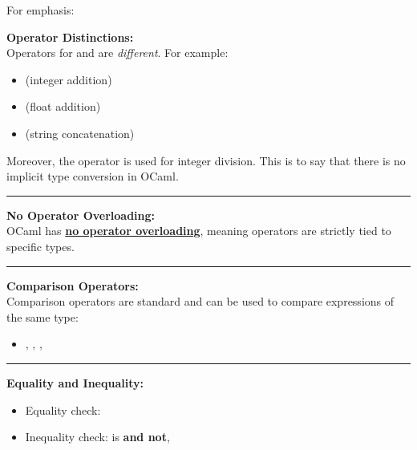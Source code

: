 \noindent
For emphasis:
\begin{Def}

    \noindent
    \textbf{Operator Distinctions:}\\
    Operators for  and  are \textit{different}. For example:
    \begin{itemize}
        \item \snippet{+} (integer addition)
        \item {} (float addition)
        \item \snippet{$^\wedge$} (string concatenation)
    \end{itemize}
    
    \noindent
    Moreover, the  operator is used for integer division. This is to 
    say that there is no implicit type conversion in OCaml.\\
    \rule{\textwidth}{0.4pt}

    \vspace{.3em}
    \noindent
    \textbf{No Operator Overloading:}\\
    OCaml has \underline{\textbf{no operator overloading}}, meaning operators are strictly tied to specific types.

    \vspace{.3em}
    \noindent
    \rule{\textwidth}{0.4pt}

    \vspace{.3em}
    \noindent
    \textbf{Comparison Operators:}\\
    Comparison operators are standard and can be used to compare expressions of the same type:
    \begin{itemize}
        \item \snippet{<}, \snippet{<=}, \snippet{>}, \snippet{>=}
    \end{itemize}

    \vspace{-.3em}
    \noindent
    \rule{\textwidth}{0.4pt}
    
    \noindent
    \textbf{Equality and Inequality:}

    \vspace{-.5em}
    \begin{itemize}
        \item Equality check: \snippet{=}
        \item Inequality check: is \snippet{<>} \textbf{and not}, \snippet{!=}
    \end{itemize}

    \vspace{-1em}
    
\end{Def}

